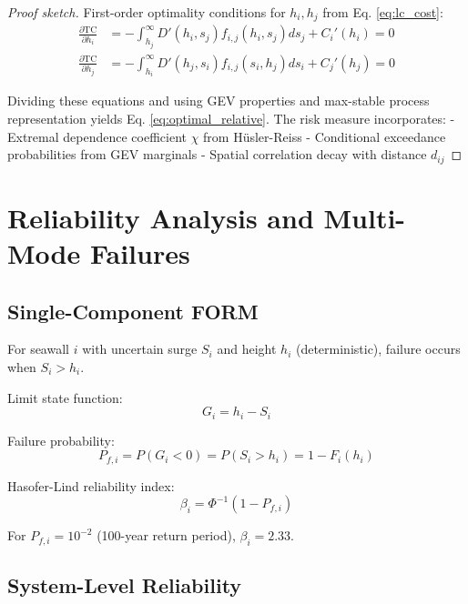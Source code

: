 \documentclass[review]{elsarticle}
\begin{document}
\begin{proof}[Proof sketch]
First-order optimality conditions for $h_i, h_j$ from Eq. \eqref{eq:lc_cost}:
\begin{align}
\frac{\partial \text{TC}}{\partial h_i} &= -\int_{h_j}^\infty D'(h_i,s_j) f_{i,j}(h_i,s_j) ds_j + C_i'(h_i) = 0\\
\frac{\partial \text{TC}}{\partial h_j} &= -\int_{h_i}^\infty D'(h_j,s_i) f_{i,j}(s_i,h_j) ds_i + C_j'(h_j) = 0
\end{align}

Dividing these equations and using GEV properties and max-stable process representation yields Eq. \eqref{eq:optimal_relative}. The risk measure incorporates:
- Extremal dependence coefficient $\chi$ from Hüsler-Reiss
- Conditional exceedance probabilities from GEV marginals
- Spatial correlation decay with distance $d_{ij}$
\end{proof}

\section{Reliability Analysis and Multi-Mode Failures}

\subsection{Single-Component FORM}

For seawall $i$ with uncertain surge $S_i$ and height $h_i$ (deterministic), failure occurs when $S_i > h_i$.

Limit state function:
\begin{equation}
G_i = h_i - S_i
\label{eq:limit_state}
\end{equation}

Failure probability:
\begin{equation}
P_{f,i} = P(G_i < 0) = P(S_i > h_i) = 1 - F_i(h_i)
\label{eq:failure_prob}
\end{equation}

Hasofer-Lind reliability index:
\begin{equation}
\beta_i = \Phi^{-1}(1 - P_{f,i})
\label{eq:reliability_index}
\end{equation}

For $P_{f,i} = 10^{-2}$ (100-year return period), $\beta_i = 2.33$.

\subsection{System-Level Reliability}
\end{document}

